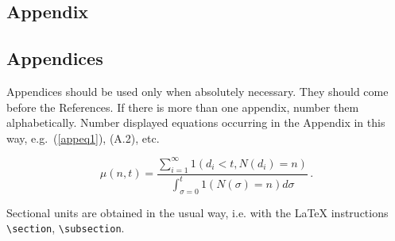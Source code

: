 \begin{appendix}
\chapter{Appendix}

\section{Appendices}
Appendices should be used only when absolutely necessary. They
should come before the References. If there is more than one
appendix, number them alphabetically. Number displayed equations
occurring in the Appendix in this way, e.g.~(\ref{appeq1}), (A.2),
etc.

\begin{equation} \mu(n, t) = \frac{\sum^\infty_{i=1} 1(d_i < t,
N(d_i) = n)} {\int^t_{\sigma=0} 1(N(\sigma) = n)d\sigma}\,.
\label{appeq1}
\end{equation}

Sectional units are obtained in the usual way, i.e. with the
\LaTeX{} instructions \verb|\section|, \verb|\subsection|.


\end{appendix}

